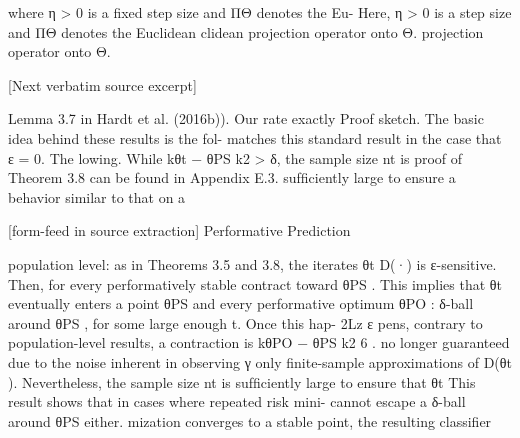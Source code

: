\documentclass[10pt]{article}
\begin{document}
\begin{ReviewVerbatim}
where η > 0 is a ﬁxed step size and ΠΘ denotes the Eu-
                                                                              Here, η > 0 is a step size and ΠΘ denotes the Euclidean
clidean projection operator onto Θ.
                                                                              projection operator onto Θ.

[Next verbatim source excerpt]

Lemma 3.7 in Hardt et al. (2016b)). Our rate exactly                          Proof sketch. The basic idea behind these results is the fol-
matches this standard result in the case that ε = 0. The                      lowing. While kθt − θPS k2 > δ, the sample size nt is
proof of Theorem 3.8 can be found in Appendix E.3.                            sufﬁciently large to ensure a behavior similar to that on a

[form-feed in source extraction]
                                                        Performative Prediction

population level: as in Theorems 3.5 and 3.8, the iterates θt         D(·) is ε-sensitive. Then, for every performatively stable
contract toward θPS . This implies that θt eventually enters a        point θPS and every performative optimum θPO :
δ-ball around θPS , for some large enough t. Once this hap-
                                                                                                            2Lz ε
pens, contrary to population-level results, a contraction is                            kθPO − θPS k2 6           .
no longer guaranteed due to the noise inherent in observing                                                  γ
only ﬁnite-sample approximations of D(θt ). Nevertheless,
the sample size nt is sufﬁciently large to ensure that θt             This result shows that in cases where repeated risk mini-
cannot escape a δ-ball around θPS either.                             mization converges to a stable point, the resulting classiﬁer
\end{ReviewVerbatim}
\end{document}
